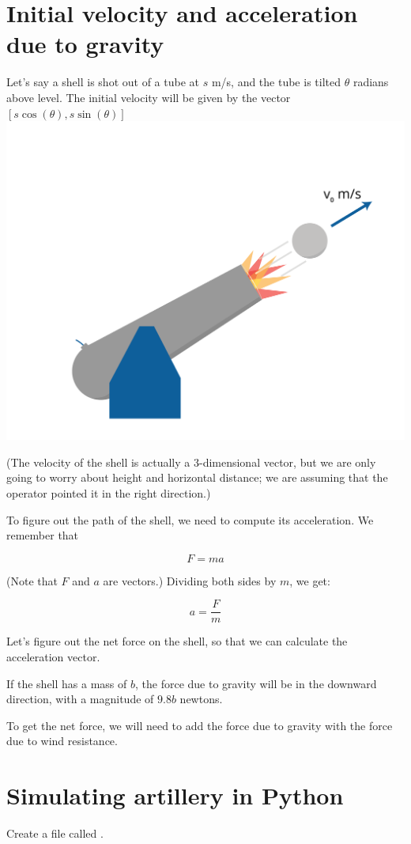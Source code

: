 \section{Initial velocity and acceleration due to gravity}

Let's say a shell is shot out of a tube at $s$ m/s, and the tube
is tilted $\theta$ radians above level. The initial velocity
will be given by the vector $[s \cos(\theta), s \sin(\theta)]$
\includegraphics[width=.5\textwidth]{cannonvi.png}



(The velocity of the shell is actually a 3-dimensional vector, but we
are only going to worry about height and horizontal distance; we are
assuming that the operator pointed it in the right direction.)

To figure out the path of the shell, we need to compute its acceleration. We remember that

$$F = m a$$

(Note that $F$ and $a$ are vectors.)  Dividing both sides by $m$, we get:

$$a = \frac{F}{m}$$

Let's figure out the net force on the shell, so that we can calculate the acceleration vector.

If the shell has a mass of $b$, the force due to gravity will be in the
downward direction, with a magnitude of $9.8 b$ newtons.

To get the net force, we will need to add the force due to gravity
with the force due to wind resistance.

\section{Simulating artillery in Python}

Create a file called .

